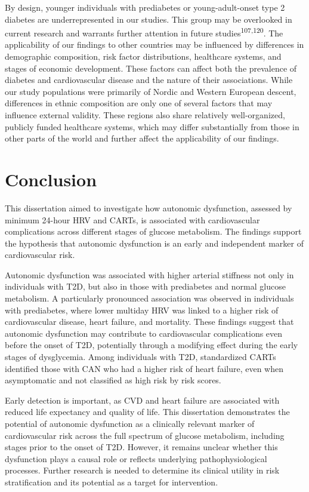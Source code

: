 \documentclass[
  a4paper,
  headsepline=true,
  open=any]{scrbook}
\begin{document}
By design, younger individuals with prediabetes or young-adult-onset
type 2 diabetes are underrepresented in our studies. This group may be
overlooked in current research and warrants further attention in future
studies\textsuperscript{107,120}. The applicability of our findings to
other countries may be influenced by differences in demographic
composition, risk factor distributions, healthcare systems, and stages
of economic development. These factors can affect both the prevalence of
diabetes and cardiovascular disease and the nature of their
associations. While our study populations were primarily of Nordic and
Western European descent, differences in ethnic composition are only one
of several factors that may influence external validity. These regions
also share relatively well-organized, publicly funded healthcare
systems, which may differ substantially from those in other parts of the
world and further affect the applicability of our findings.


\hypertarget{conclusion}{%
\chapter{Conclusion}\label{conclusion}}

This dissertation aimed to investigate how autonomic dysfunction,
assessed by minimum 24-hour HRV and CARTs, is associated with
cardiovascular complications across different stages of glucose
metabolism. The findings support the hypothesis that autonomic
dysfunction is an early and independent marker of cardiovascular risk.

Autonomic dysfunction was associated with higher arterial stiffness not
only in individuals with T2D, but also in those with prediabetes and
normal glucose metabolism. A particularly pronounced association was
observed in individuals with prediabetes, where lower multiday HRV was
linked to a higher risk of cardiovascular disease, heart failure, and
mortality. These findings suggest that autonomic dysfunction may
contribute to cardiovascular complications even before the onset of T2D,
potentially through a modifying effect during the early stages of
dysglycemia. Among individuals with T2D, standardized CARTs identified
those with CAN who had a higher risk of heart failure, even when
asymptomatic and not classified as high risk by risk scores.

Early detection is important, as CVD and heart failure are associated
with reduced life expectancy and quality of life. This dissertation
demonstrates the potential of autonomic dysfunction as a clinically
relevant marker of cardiovascular risk across the full spectrum of
glucose metabolism, including stages prior to the onset of T2D. However,
it remains unclear whether this dysfunction plays a causal role or
reflects underlying pathophysiological processes. Further research is
needed to determine its clinical utility in risk stratification and its
potential as a target for intervention.
\end{document}
